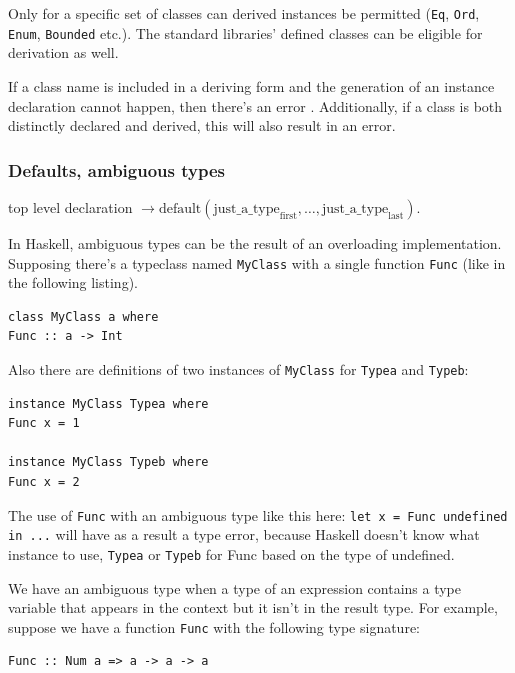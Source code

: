\documentclass[a4paper, titlepage, twoside]{article}
\begin{document}
Only for a specific set of classes can derived instances be permitted (\texttt{Eq}, \texttt{Ord}, \texttt{Enum}, \texttt{Bounded} etc.). The standard libraries’ defined classes can be eligible for derivation as well.

If a class name is included in a deriving form and the generation of an instance declaration cannot happen, then there’s an error \autocite{marlowHaskell2010Language2010}. Additionally, if a class is both distinctly declared and derived, this will also result in an error.

\subsubsection{Defaults, ambiguous types}
\label{sec:org6338d2b}

top level declaration \(\rightarrow \text{default} (\text{just}\_\text{a}\_\text{type}_{\text{first}}, \dots, \text{just}\_\text{a}\_\text{type}_{\text{last}})\).

In Haskell, ambiguous types can be the result of an overloading implementation. Supposing there’s a
typeclass named \texttt{MyClass} with a single function \texttt{Func} (like in the following listing).

\begin{verbatim}
class MyClass a where
Func :: a -> Int
\end{verbatim}

Also there are definitions of two instances of \texttt{MyClass} for \texttt{Typea} and \texttt{Typeb}:

\begin{verbatim}
instance MyClass Typea where
Func x = 1

instance MyClass Typeb where
Func x = 2  
\end{verbatim}

The use of \texttt{Func} with an ambiguous type like this here: \texttt{let x = Func undefined in ...} will have as a result a type error, because Haskell doesn’t know what instance to use, \texttt{Typea} or \texttt{Typeb} for Func based on the type of undefined.

We have an ambiguous type when a type of an expression contains a type variable that appears in the
context but it isn't in the result type. For example, suppose we have a function \texttt{Func} with the following type signature:

\begin{verbatim}
Func :: Num a => a -> a -> a
\end{verbatim}
\end{document}
